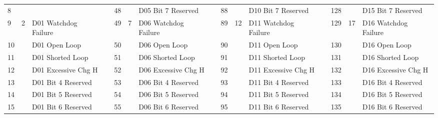 \documentclass[]{article}
\begin{document}
\begin{landscape}
\begin{table}[]
\begin{tabular}{lllllllllllllll}
			8            &                    &                               &                   & 48           &                     & D05 Bit 7 Reserved   &  & 88           &                     & D10 Bit 7 Reserved   &  & 128               &                     & D15 Bit 7 Reserved   \\ \cline{1-3} \cline{5-7} \cline{9-11} \cline{13-15} 
			9            & \multirow{8}{*}{2} & D01 Watchdog Failure          &                   & 49           & \multirow{8}{*}{7}  & D06 Watchdog Failure &  & 89           & \multirow{8}{*}{12} & D11 Watchdog Failure &  & 129               & \multirow{8}{*}{17} & D16 Watchdog Failure \\
			10           &                    & D01 Open Loop                 &                   & 50           &                     & D06 Open Loop        &  & 90           &                     & D11 Open Loop        &  & 130               &                     & D16 Open Loop        \\
			11           &                    & D01 Shorted Loop              &                   & 51           &                     & D06 Shorted Loop     &  & 91           &                     & D11 Shorted Loop     &  & 131               &                     & D16 Shorted Loop     \\
			12           &                    & D01 Excessive Chg H           &                   & 52           &                     & D06 Excessive Chg H  &  & 92           &                     & D11 Excessive Chg H  &  & 132               &                     & D16 Excessive Chg H  \\
			13           &                    & D01 Bit 4 Reserved            &                   & 53           &                     & D06 Bit 4 Reserved   &  & 93           &                     & D11 Bit 4 Reserved   &  & 133               &                     & D16 Bit 4 Reserved   \\
			14           &                    & D01 Bit 5 Reserved            &                   & 54           &                     & D06 Bit 5 Reserved   &  & 94           &                     & D11 Bit 5 Reserved   &  & 134               &                     & D16 Bit 5 Reserved   \\
			15           &                    & D01 Bit 6 Reserved            &                   & 55           &                     & D06 Bit 6 Reserved   &  & 95           &                     & D11 Bit 6 Reserved   &  & 135               &                     & D16 Bit 6 Reserved   \\

\end{tabular}
\end{table}
\end{landscape}
\end{document}
